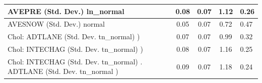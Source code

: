 \begin{table}
\begin{center}
\begin{tabular}{|l|l|c|c|c|l|}
			\hline
			AVEPRE (Std. Dev.) ln_normal &  & 0.08 & 0.07 & 1.12 & 0.26 \\
			\hline
			AVESNOW (Std. Dev.) normal &  & 0.05 & 0.07 & 0.72 & 0.47 \\
			\hline
			 Chol: ADTLANE (Std. Dev. tn_normal) ) &  & 0.07 & 0.07 & 0.99 & 0.32 \\
			\hline
			 Chol: INTECHAG (Std. Dev. tn_normal) ) &  & 0.08 & 0.07 & 1.16 & 0.25 \\
			\hline
			 Chol: INTECHAG (Std. Dev. tn_normal) . ADTLANE (Std. Dev.   tn_normal ) &  & 0.09 & 0.07 & 1.18 & 0.24 \\
			\hline
		\end{tabular}
	\end{center}
\end{table}